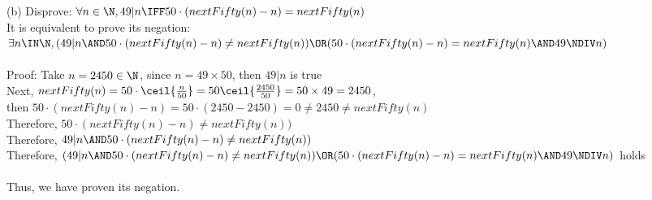 \documentclass[12pt]{article}
\begin{document}
(b) Disprove: $\forall n \in \N,49|n \IFF 50 \cdot (nextFifty(n) - n) = nextFifty(n)$\\
It is equivalent to prove its negation: $\exists n \IN \N,(49|n \AND 50 \cdot (nextFifty(n) - n) \neq nextFifty(n)) \OR (50 \cdot (nextFifty(n) -n) = nextFifty(n) \AND 49\NDIV n)$\\
\\
Proof: Take $n = 2450 \in \N$, since $n = 49 \times 50$, then $49|n$ is true\\
Next, $nextFifty(n) = 50 \cdot \ceil{\frac{n}{50}} = 50\ceil{\frac{2450}{50}} = 50 \times 49 = 2450$,\\
then $50 \cdot (nextFifty(n) - n) = 50 \cdot (2450 - 2450) = 0 \neq 2450 \neq nextFifty(n)$\\
Therefore, $50 \cdot (nextFifty(n) - n) \neq nextFifty(n))$\\
Therefore, $49|n \AND 50 \cdot (nextFifty(n) - n) \neq nextFifty(n))$\\
Therefore, $(49|n \AND 50 \cdot (nextFifty(n) - n) \neq nextFifty(n)) \OR (50 \cdot (nextFifty(n) -n) = nextFifty(n) \AND 49\NDIV n)$ holds\\
\\
Thus, we have proven its negation.
\end{document}

